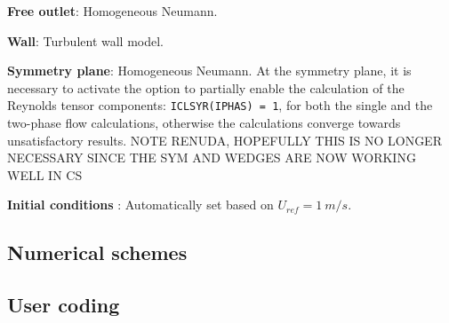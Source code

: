 \documentclass[a4paper,twoside,12pt]{article}
\begin{document}
\begin{itemize}
\begin{description}
\begin{description}
         \end{description}

   \item[-]\textbf{Free outlet}: Homogeneous Neumann.
   \item[-]\textbf{Wall}: Turbulent wall model.
   \item[-]\textbf{Symmetry plane}: Homogeneous Neumann. At the symmetry plane, it is necessary to activate the option to partially enable the calculation of the Reynolds tensor components: \texttt{ICLSYR(IPHAS) = 1}, for both the single and the two-phase flow calculations, otherwise the calculations converge towards unsatisfactory results.  NOTE RENUDA, HOPEFULLY THIS IS NO LONGER NECESSARY SINCE THE SYM AND WEDGES ARE NOW WORKING WELL IN CS

   \item[-]\textbf{Initial conditions} : Automatically set based on $U_{ref}=1~m/s$.
\end{description}

\end{itemize}

\subsection{Numerical schemes}


\subsection{User coding}
\end{document}
